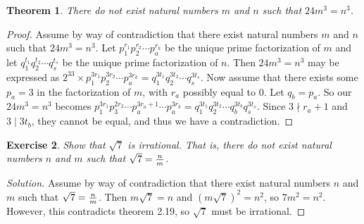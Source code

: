 \documentclass[12pt,leqno]{article}
\numberwithin{equation}{section}
\newtheorem{thm}{Theorem}[section]
\newtheorem{exer}[thm]{Exercise}
\theoremstyle{definition}
\begin{document}

\begin{thm}
There do not exist natural numbers $m$ and $n$ such that $24m^3 = n^3$.
\end{thm}

\begin{proof}[Proof]
Assume by way of contradiction that there exist natural numbers $m$ and $n$ such that $24m^3 = n^3$.  Let $p_1^{r_1}p_2^{r_2}\cdots p_a^{r_k}$ be the unique prime factorization of $m$ and let $q_1^{t_1}q_2^{t_2}\cdots q_s^{t_s}$ be the unique prime factorization of $n$.  Then $24m^3 = n^3$ may be expressed as $2^33 \times p_1^{3r_1}p_2^{3r_2}\cdots p_a^{3r_k} = q_1^{3t_1}q_2^{3t_2}\cdots q_s^{3t_s}$. Now assume that there exists some  $p_a = 3$ in the factorization of $m$, with $r_a$ possibly equal to 0.  Let $q_b = p_a$.  So our $24m^3 = n^3$ becomes $p_1^{3r_1}p_3^{2r_2}\cdots p_a^{3r_a + 1} \cdots p_a^{3r_k} = q_1^{3t_1}q_2^{3t_2}\cdots q_b^{3t_b} q_s^{3t_s}$.  Since $3 \nmid r_a + 1$ and $3 \mid 3t_b$, they cannot be equal, and thus we have a contradiction.
\end{proof}


\begin{exer}
Show that $\sqrt{7}$ is irrational.  That is, there do not exist natural numbers $n$ and $m$ such that $\sqrt{7} = {n \over m}$.
\end{exer}

\begin{proof}[Solution]
Assume by way of contradiction that there exist natural numbers $n$ and $m$ such that $\sqrt{7} = {n \over m}$.  Then $m \sqrt{7} = n$ and $(m \sqrt{7})^2 = n^2$, so $7m^2 = n^2$.  However, this contradicts theorem 2.19, so $\sqrt{7}$ must be irrational.
\end{proof}
\end{document}
